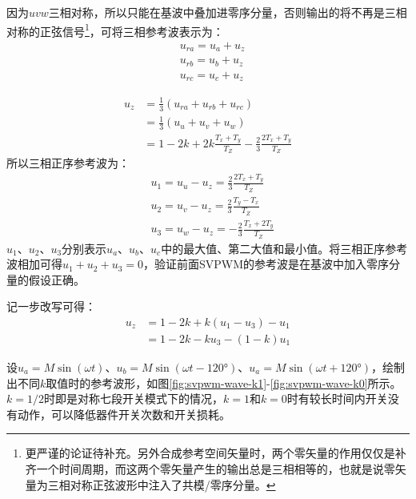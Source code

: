 \documentclass{ctexart}
\numberwithin{equation}{section}
\begin{document}
因为$uvw$三相对称，所以只能在基波中叠加进零序分量，否则输出的将不再是三相对称的正弦信号\footnote{更严谨的论证待补充。另外合成参考空间矢量时，两个零矢量的作用仅仅是补齐一个时间周期，而这两个零矢量产生的输出总是三相相等的，也就是说零矢量为三相对称正弦波形中注入了共模/零序分量。}，可将三相参考波表示为：
\begin{equation}
   \begin{aligned}
  	&u_{ra} = u_{a} + u_z\\
  	&u_{rb} = u_{b} + u_z\\
  	&u_{rc} = u_{c} + u_z
  \end{aligned}
\end{equation}

\begin{equation}
\begin{aligned}
	u_z &= \frac{1}{3}(u_{ra}+u_{rb}+u_{rc})\\
	&= \frac{1}{3}(u_{u}+u_{v}+u_{w})\\
	&= 1-2k+2k\frac{T_x+T_y}{T_Z} - \frac{2}{3}\frac{2T_x+T_y}{T_Z}
\end{aligned}
\end{equation}
所以三相正序参考波为：
\begin{equation}
 \begin{aligned}
 	&u_1 = u_u - u_z = \frac{2}{3}\frac{2T_x+T_y}{T_Z}\\
 	&u_2 = u_v - u_z = \frac{2}{3}\frac{T_y-T_x}{T_Z}\\
 	&u_3 = u_w - u_z = -\frac{2}{3}\frac{T_x+2T_y}{T_Z}
 \end{aligned}
\end{equation}
$ u_1 $、$ u_2 $、$ u_3 $分别表示$ u_a $、$ u_b $、$ u_c $中的最大值、第二大值和最小值。将三相正序参考波相加可得$u_1 + u_2 + u_3 =0$，验证前面SVPWM的参考波是在基波中加入零序分量的假设正确。

记一步改写可得：
\begin{equation}
\begin{aligned}
	u_z &= 1-2k + k(u_1-u_3)-u_1\\
	&=1-2k-ku_3-(1-k)u_1
\end{aligned}
\end{equation}

设$u_a = M\sin(\omega t)$、$u_b = M\sin(\omega t-\ang{120})$、$u_a = M\sin(\omega t + \ang{120})$，绘制出不同$ k $取值时的参考波形，如图\ref{fig:svpwm-wave-k1}-\ref{fig:svpwm-wave-k0}所示。$ k=1/2 $时即是对称七段开关模式下的情况，$ k=1 $和$ k=0 $时有较长时间内开关没有动作，可以降低器件开关次数和开关损耗。
\end{document}
